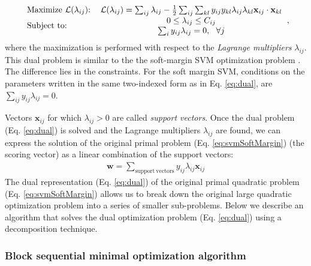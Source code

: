 \begin{eqnarray}
\begin{tabular}{lc}
Maximize $\mathcal{L}(\lambda_{ij}$):&$ \mathcal{L}(\lambda_{ij})=\sum_{ij} \lambda_{ij} - \frac{1}{2}\sum_{ij}\sum_{kl}y_{ij} y_{kl} \lambda_{ij}\lambda_{kl}\mathbf{x}_{ij}\cdot\mathbf{x}_{kl}$ \\ 
\multirow{2}{*}{Subject to:}
&$0 \leq \lambda_{ij} \leq C_{ij}$\\%
&$ \sum_i y_{ij}\lambda_{ij} = 0,~~\forall j$
\end{tabular}
,
\label{eq:dual} 
\end{eqnarray}
where the maximization  is performed with respect to the {\em Lagrange multipliers} $\lambda_{ij}$.
This dual problem is similar to the the soft-margin SVM optimization problem \cite{Cortes1995}. The difference lies in the constraints. For the soft margin SVM, 
conditions on the parameters written in the same two-indexed form as in Eq. \ref{eq:dual}, are $\sum_{ij} y_{ij}\lambda_{ij} = 0$.

Vectors $\mathbf{x}_{ij}$ for which $ \lambda_{ij}>0$ are called {\em support vectors}. Once the dual problem (Eq. \ref{eq:dual}) is solved and the Lagrange 
multipliers $\lambda_{ij}$ are found, we can express the solution of the original primal problem (Eq. \ref{eq:svmSoftMargin}) (the scoring vector) as a linear 
combination of the support vectors:
\begin{eqnarray}
\mathbf{w} = \sum_{ \mathrm {support~vectors}} y_{ij}\lambda_{ij}\mathbf{x}_{ij}
\label{eq:scoringVector}
\end{eqnarray}
%
The dual representation  (Eq. \ref{eq:dual}) of the original primal quadratic problem (Eq. \ref{eq:svmSoftMargin}) allows us to break down the original 
large quadratic optimization problem into a series of smaller sub-problems. Below we describe an algorithm that solves the 
dual optimization problem (Eq. \ref{eq:dual}) using a decomposition technique.

\subsubsection{Block sequential minimal optimization algorithm}

